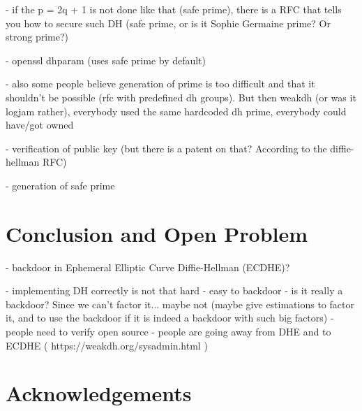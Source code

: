 \documentclass[a4paper,11pt,twocolumn]{article}
\begin{document}
- if the p = 2q + 1 is not done like that (safe prime), there is a RFC that tells you how to secure such DH (safe prime, or is it Sophie Germaine prime? Or strong prime?)

- openssl dhparam (uses safe prime by default)

- also some people believe generation of prime is too difficult and that it shouldn't be possible (rfc with predefined dh groups). But then weakdh (or was it logjam rather), everybody used the same hardcoded dh prime, everybody could have/got owned

- verification of public key (but there is a patent on that? According to the diffie-hellman RFC)

- generation of safe prime


\section{Conclusion and Open Problem}

- backdoor in Ephemeral Elliptic Curve Diffie-Hellman (ECDHE)?

- implementing DH correctly is not that hard
- easy to backdoor
- is it really a backdoor? Since we can't factor it... maybe not (maybe give estimations to factor it, and to use the backdoor if it is indeed a backdoor with such big factors)
- people need to verify open source
- people are going away from DHE and to ECDHE ( https://weakdh.org/sysadmin.html )
\newpage

\section*{Acknowledgements}


\newpage
\end{document}
